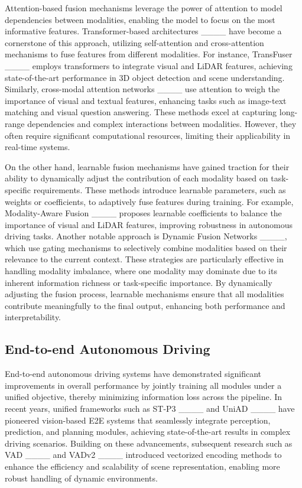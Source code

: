 Attention-based fusion mechanisms leverage the power of attention to model dependencies between modalities, enabling the model to focus on the most informative features. Transformer-based architectures ____ have become a cornerstone of this approach, utilizing self-attention and cross-attention mechanisms to fuse features from different modalities. For instance, TransFuser ____ employs transformers to integrate visual and LiDAR features, achieving state-of-the-art performance in 3D object detection and scene understanding. Similarly, cross-modal attention networks ____ use attention to weigh the importance of visual and textual features, enhancing tasks such as image-text matching and visual question answering. These methods excel at capturing long-range dependencies and complex interactions between modalities. However, they often require significant computational resources, limiting their applicability in real-time systems.

On the other hand, learnable fusion mechanisms have gained traction for their ability to dynamically adjust the contribution of each modality based on task-specific requirements. These methods introduce learnable parameters, such as weights or coefficients, to adaptively fuse features during training. For example, Modality-Aware Fusion ____ proposes learnable coefficients to balance the importance of visual and LiDAR features, improving robustness in autonomous driving tasks. Another notable approach is Dynamic Fusion Networks ____, which use gating mechanisms to selectively combine modalities based on their relevance to the current context. These strategies are particularly effective in handling modality imbalance, where one modality may dominate due to its inherent information richness or task-specific importance. By dynamically adjusting the fusion process, learnable mechanisms ensure that all modalities contribute meaningfully to the final output, enhancing both performance and interpretability.

\subsection{End-to-end Autonomous Driving} 
End-to-end autonomous driving systems have demonstrated significant improvements in overall performance by jointly training all modules under a unified objective, thereby minimizing information loss across the pipeline. In recent years, unified frameworks such as ST-P3 ____ and UniAD ____ have pioneered vision-based E2E systems that seamlessly integrate perception, prediction, and planning modules, achieving state-of-the-art results in complex driving scenarios. Building on these advancements, subsequent research such as VAD ____ and VADv2 ____ introduced vectorized encoding methods to enhance the efficiency and scalability of scene representation, enabling more robust handling of dynamic environments.

